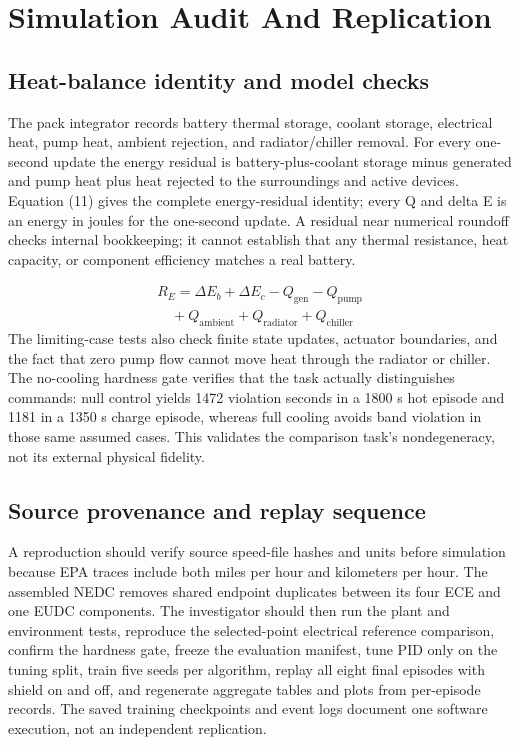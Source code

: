 \documentclass[conference]{IEEEtran}
\begin{document}
\section{Simulation Audit And Replication}
\subsection{Heat-balance identity and model checks}
The pack integrator records battery thermal storage, coolant storage, electrical heat, pump heat, ambient rejection, and radiator/chiller removal. For every one-second update the energy residual is battery-plus-coolant storage minus generated and pump heat plus heat rejected to the surroundings and active devices. Equation (11) gives the complete energy-residual identity; every Q and delta E is an energy in joules for the one-second update. A residual near numerical roundoff checks internal bookkeeping; it cannot establish that any thermal resistance, heat capacity, or component efficiency matches a real battery.

\begin{equation}
\begin{gathered}R_E=\Delta E_b+\Delta E_c-Q_{\mathrm{gen}}-Q_{\mathrm{pump}}\\\quad+Q_{\mathrm{ambient}}+Q_{\mathrm{radiator}}+Q_{\mathrm{chiller}}\end{gathered}
\label{eq:11}
\end{equation}
The limiting-case tests also check finite state updates, actuator boundaries, and the fact that zero pump flow cannot move heat through the radiator or chiller. The no-cooling hardness gate verifies that the task actually distinguishes commands: null control yields 1472 violation seconds in a 1800 s hot episode and 1181 in a 1350 s charge episode, whereas full cooling avoids band violation in those same assumed cases. This validates the comparison task's nondegeneracy, not its external physical fidelity.

\subsection{Source provenance and replay sequence}
A reproduction should verify source speed-file hashes and units before simulation because EPA traces include both miles per hour and kilometers per hour. The assembled NEDC removes shared endpoint duplicates between its four ECE and one EUDC components. The investigator should then run the plant and environment tests, reproduce the selected-point electrical reference comparison, confirm the hardness gate, freeze the evaluation manifest, tune PID only on the tuning split, train five seeds per algorithm, replay all eight final episodes with shield on and off, and regenerate aggregate tables and plots from per-episode records. The saved training checkpoints and event logs document one software execution, not an independent replication.
\end{document}

